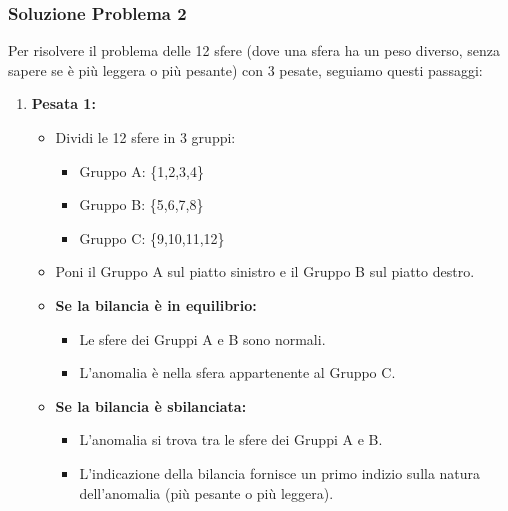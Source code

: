 \documentclass[a4paper,12pt]{article}
\begin{document}
\subsubsection*{Soluzione Problema 2}
Per risolvere il problema delle 12 sfere (dove una sfera ha un peso diverso, senza sapere se è più leggera o più pesante) con 3 pesate, seguiamo questi passaggi:
\begin{enumerate}[label={}, leftmargin=2cm]
  \item \textbf{Pesata 1:}
  \begin{itemize}
    \item Dividi le 12 sfere in 3 gruppi:
      \begin{itemize}
        \item Gruppo A: \{1,2,3,4\}
        \item Gruppo B: \{5,6,7,8\}
        \item Gruppo C: \{9,10,11,12\}
      \end{itemize}
    \item Poni il Gruppo A sul piatto sinistro e il Gruppo B sul piatto destro.
    \item \textbf{Se la bilancia è in equilibrio:}
      \begin{itemize}
        \item Le sfere dei Gruppi A e B sono normali.
        \item L'anomalia è nella sfera appartenente al Gruppo C.
      \end{itemize}
    \item \textbf{Se la bilancia è sbilanciata:}
      \begin{itemize}
        \item L'anomalia si trova tra le sfere dei Gruppi A e B.
        \item L'indicazione della bilancia fornisce un primo indizio sulla natura dell'anomalia (più pesante o più leggera).
      \end{itemize}
  \end{itemize}


\end{enumerate}
\end{document}
